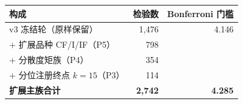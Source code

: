 \begin{tabular}{lrr}
\toprule
构成 & 检验数 & Bonferroni 门槛 \\
\midrule
v3 冻结轮（原样保留） & 1,476 & 4.146 \\
$+$ 扩展品种 CF/I/IF（P5） & 798 & \\
$+$ 分散度矩族（P4） & 354 & \\
$+$ 分位注册终点 $k{=}15$（P3） & 114 & \\
\midrule
\textbf{扩展主族合计} & \textbf{2,742} & \textbf{4.285} \\
\bottomrule
\end{tabular}
